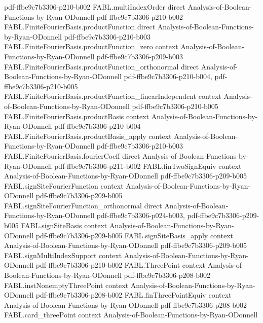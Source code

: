 \begin{theorem}
  {pdf-ffbe9c7b3306-p210-b002}
\proofstep
  {FABL.multiIndexOrder}
  {direct}
  {Analysis-of-Boolean-Functions-by-Ryan-ODonnell}
  {pdf-ffbe9c7b3306-p210-b002}
\proofstep
  {FABL.FiniteFourierBasis.productFunction}
  {direct}
  {Analysis-of-Boolean-Functions-by-Ryan-ODonnell}
  {pdf-ffbe9c7b3306-p210-b003}
\proofstep
  {FABL.FiniteFourierBasis.productFunction_zero}
  {context}
  {Analysis-of-Boolean-Functions-by-Ryan-ODonnell}
  {pdf-ffbe9c7b3306-p209-b003}
\proofstep
  {FABL.FiniteFourierBasis.productFunction_orthonormal}
  {direct}
  {Analysis-of-Boolean-Functions-by-Ryan-ODonnell}
  {pdf-ffbe9c7b3306-p210-b004,
    pdf-ffbe9c7b3306-p210-b005}
\proofstep
  {FABL.FiniteFourierBasis.productFunction_linearIndependent}
  {context}
  {Analysis-of-Boolean-Functions-by-Ryan-ODonnell}
  {pdf-ffbe9c7b3306-p210-b005}
\proofstep
  {FABL.FiniteFourierBasis.productBasis}
  {context}
  {Analysis-of-Boolean-Functions-by-Ryan-ODonnell}
  {pdf-ffbe9c7b3306-p210-b004}
\proofstep
  {FABL.FiniteFourierBasis.productBasis_apply}
  {context}
  {Analysis-of-Boolean-Functions-by-Ryan-ODonnell}
  {pdf-ffbe9c7b3306-p210-b003}
\proofstep
  {FABL.FiniteFourierBasis.fourierCoeff}
  {direct}
  {Analysis-of-Boolean-Functions-by-Ryan-ODonnell}
  {pdf-ffbe9c7b3306-p211-b002}
\proofstep
  {FABL.finTwoSignEquiv}
  {context}
  {Analysis-of-Boolean-Functions-by-Ryan-ODonnell}
  {pdf-ffbe9c7b3306-p209-b005}
\proofstep
  {FABL.signSiteFourierFunction}
  {context}
  {Analysis-of-Boolean-Functions-by-Ryan-ODonnell}
  {pdf-ffbe9c7b3306-p209-b005}
\proofstep
  {FABL.signSiteFourierFunction_orthonormal}
  {direct}
  {Analysis-of-Boolean-Functions-by-Ryan-ODonnell}
  {pdf-ffbe9c7b3306-p024-b003,
    pdf-ffbe9c7b3306-p209-b005}
\proofstep
  {FABL.signSiteBasis}
  {context}
  {Analysis-of-Boolean-Functions-by-Ryan-ODonnell}
  {pdf-ffbe9c7b3306-p209-b005}
\proofstep
  {FABL.signSiteBasis_apply}
  {context}
  {Analysis-of-Boolean-Functions-by-Ryan-ODonnell}
  {pdf-ffbe9c7b3306-p209-b005}
\proofstep
  {FABL.signMultiIndexSupport}
  {context}
  {Analysis-of-Boolean-Functions-by-Ryan-ODonnell}
  {pdf-ffbe9c7b3306-p210-b002}
\proofstep
  {FABL.ThreePoint}
  {context}
  {Analysis-of-Boolean-Functions-by-Ryan-ODonnell}
  {pdf-ffbe9c7b3306-p208-b002}
\proofstep
  {FABL.instNonemptyThreePoint}
  {context}
  {Analysis-of-Boolean-Functions-by-Ryan-ODonnell}
  {pdf-ffbe9c7b3306-p208-b002}
\proofstep
  {FABL.finThreePointEquiv}
  {context}
  {Analysis-of-Boolean-Functions-by-Ryan-ODonnell}
  {pdf-ffbe9c7b3306-p208-b002}
\proofstep
  {FABL.card_threePoint}
  {context}
  {Analysis-of-Boolean-Functions-by-Ryan-ODonnell}

\end{theorem}
